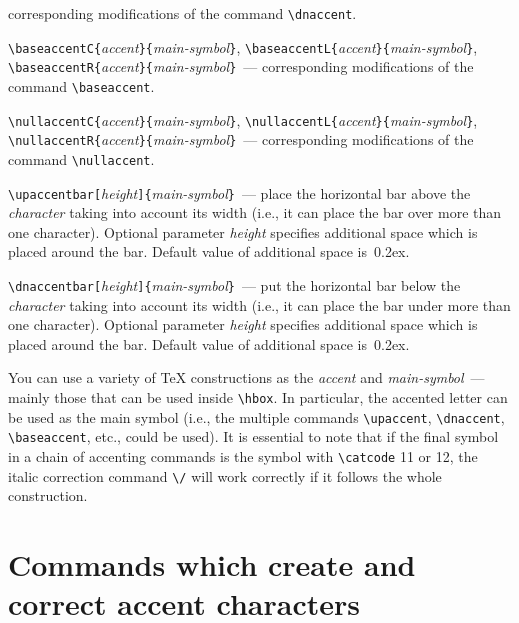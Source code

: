 \begin{description}
   corresponding modifications of the command \verb?\dnaccent?.
\item[] \verb?\baseaccentC{?{\em accent}\verb?}{?{\em main-symbol}\verb?}?,
        \verb?\baseaccentL{?{\em accent}\verb?}{?{\em main-symbol}\verb?}?,\\
        \verb?\baseaccentR{?{\em accent}\verb?}{?{\em main-symbol}\verb?}?~---
   corresponding modifications of the command  \verb?\baseaccent?.
\item[] \verb?\nullaccentC{?{\em accent}\verb?}{?{\em main-symbol}\verb?}?,
        \verb?\nullaccentL{?{\em accent}\verb?}{?{\em main-symbol}\verb?}?,\\
        \verb?\nullaccentR{?{\em accent}\verb?}{?{\em main-symbol}\verb?}?~---
   corresponding modifications of the command  \verb?\nullaccent?.
\item[] \verb?\upaccentbar[?{\em height}\verb?]{?{\em main-symbol}\verb?}?~---
   place the horizontal bar above the {\em character}
   taking into account its width (i.e., it can place the bar over
   more than one character). Optional parameter {\em height}
   specifies additional space which is placed around the bar.
   Default value of additional space is~\textsf{0.2ex}.
\item[] \verb?\dnaccentbar[?{\em height}\verb?]{?{\em main-symbol}\verb?}?~---
   put the horizontal bar below the {\em character}
   taking into account its width (i.e., it can place the bar under
   more than one character). Optional parameter {\em height}
   specifies additional space which is placed around the bar.
   Default value of additional space is~\textsf{0.2ex}.
\end{description}
You can use a variety of \TeX{} constructions as the {\em accent}
and {\em main-symbol}~--- mainly those that can be used inside
\verb?\hbox?. In particular, the accented letter can be used as the main
symbol (i.e., the multiple commands
\verb?\upaccent?, \verb?\dnaccent?, \verb?\baseaccent?, etc.,
could be used).
It is essential to note that if the final symbol in a chain
of accenting commands is the symbol with \verb?\catcode?
11 or 12, the italic correction command \verb?\/? will work
correctly if it follows the whole construction.

\section{Commands which create and correct accent
         characters\label{S-commandsI}}

